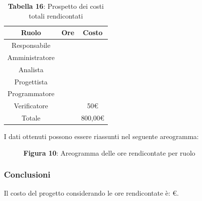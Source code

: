 \begin{table}[H]
	\centering
	\renewcommand{\arraystretch}{1.5}
	\begin{tabular}{|c|c|c|}
		\hline
		\rowcolor{lighter-grayer}
		Ruolo & Ore & Costo \\
		\hline
		Responsabile &  &  \\
		\hline
		Amministratore &  &  \\
		\hline
		Analista &  &  \\
		\hline
		Progettista&  &  \\
		\hline
		Programmatore &  &  \\
		\hline
		Verificatore &  & 50\euro \\
		\hline
		Totale &  &  800,00\euro \\
		\hline
	\end{tabular}
	\caption*{\textbf{Tabella 16}: Prospetto dei costi totali rendicontati \\}
\end{table}

I dati ottenuti possono essere riassunti nel seguente areogramma:


\begin{figure}[!h]
	\centering
	\caption*{\textbf{Figura 10}: Areogramma delle ore rendicontate per ruolo}
    \label{fig:Figura10}
\end{figure}

\subsubsection{Conclusioni}
Il costo del progetto considerando le ore rendicontate è: \euro.